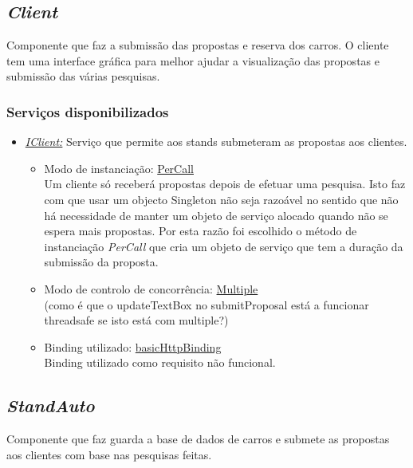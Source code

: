 \documentclass[a4paper]{article}
\begin{document}
\subsection{\emph{Client}}
Componente que faz a submissão das propostas e reserva dos carros. O cliente tem uma interface gráfica para melhor ajudar a visualização das propostas e submissão das várias pesquisas.
\subsubsection{Serviços disponibilizados}
\begin{itemize} 

\item
\emph{\underline{IClient:}}
Serviço que permite aos stands submeteram as propostas aos clientes.
	\begin{itemize}
		\item
		Modo de instanciação: \underline{PerCall}\\
		Um cliente só receberá propostas depois de efetuar uma pesquisa. Isto faz com que usar um objecto Singleton não seja razoável no sentido que não há necessidade de manter um objeto de serviço alocado quando não se espera mais propostas. Por esta razão foi escolhido o método de instanciação \emph{PerCall} que cria um objeto de serviço que tem a duração da submissão da proposta.
		\item
		Modo de controlo de concorrência: \underline{Multiple}\\
		(como é que o updateTextBox no submitProposal está a funcionar threadsafe se isto está com multiple?)
		
		\item
		Binding utilizado: \underline{basicHttpBinding}\\
		Binding utilizado como requisito não funcional.
	\end{itemize}
\end{itemize}


\subsection{\emph{StandAuto}}
Componente que faz guarda a base de dados de carros e submete as propostas aos clientes com base nas pesquisas feitas.
\end{document}

